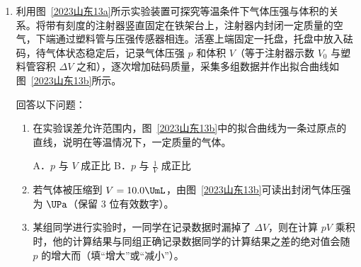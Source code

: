 \documentclass[\gkver]{gaokaozhenti}
\begin{document}
\begin{enumerate}

{$B_{2}$ 的方向向下}
{$v_{2} = 5 \Ums$}
{$v_{2} = 3 \Ums$}


\item
利用图~\ref{2023山东13a}所示实验装置可探究等温条件下气体压强与体积的关系。将带有刻度的注射器竖直固定在铁架台上，注射器内封闭一定质量的空气，下端通过塑料管与压强传感器相连。活塞上端固定一托盘，托盘中放入砝码，待气体状态稳定后，记录气体压强 $p$ 和体积 $V$（等于注射器示数 $V_{0}$ 与塑料管容积 $\Delta V$ 之和），逐次增加砝码质量，采集多组数据并作出拟合曲线如图~\ref{2023山东13b}所示。

回答以下问题：
\begin{enumerate}
	\item
	在实验误差允许范围内，图~\ref{2023山东13b}中的拟合曲线为一条过原点的直线，说明在等温情况下，一定质量的气体。

	A．$p$ 与 $V$ 成正比 \qquad B．$p$ 与 $\frac{1}{V}$ 成正比

	\item
	若气体被压缩到 $V = 10.0 \UmL$，由图~\ref{2023山东13b}可读出封闭气体压强为 $\UPa$（保留 3 位有效数字）。

	\item
	某组同学进行实验时，一同学在记录数据时漏掉了 $\Delta V$，则在计算 $pV$ 乘积时，他的计算结果与同组正确记录数据同学的计算结果之差的绝对值会随 $p$ 的增大而（填“增大”或“减小”）。
\end{enumerate}


\end{enumerate}
\end{document}

